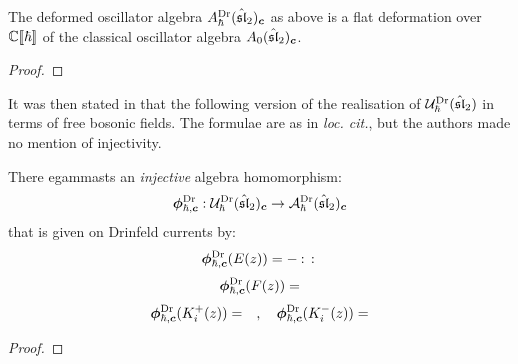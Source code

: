         \begin{proposition} \label{prop: q_deformed_affine_sl_2_oscillator_algebra_drinfeld_current_presentation_PBW}
            The deformed oscillator algebra $A_{\hbar}^{\mathrm{Dr}}(\hat{\mathfrak{sl}}_2)_{\boldsymbol{c}}$ as above is a flat deformation over $\mathbb{C}[\![\hbar]\!]$ of the classical oscillator algebra $A_0(\hat{\mathfrak{sl}}_2)_{\boldsymbol{c}}$.
        \end{proposition}
            \begin{proof}
                
            \end{proof}
            
        It was then stated in \cite[Proposition 4]{frenkel_reshetikhin_affine_QUEs_and_deformed_virasoro_and_finite_W_algebras} that the following version of the realisation of $\mathcal{U}_{\hbar}^{\mathrm{Dr}}(\hat{\mathfrak{sl}}_2)$ in terms of free bosonic fields. The formulae are as in \textit{loc. cit.}, but the authors made no mention of injectivity. 
        \begin{proposition} \label{prop: free_boson_realisation_quantum_affine_sl_2_drinfeld_current_presentation}
            There egammasts an \textit{injective} algebra homomorphism:
                \begin{equation} \label{equation: free_boson_realisation_quantum_affine_sl_2_drinfeld_current_presentation}
                    \boldsymbol{\phi}^{\mathrm{Dr}}_{\hbar, \boldsymbol{c}}: \mathcal{U}_{\hbar}^{\mathrm{Dr}}(\hat{\mathfrak{sl}}_2)_{\boldsymbol{c}} \to \mathcal{A}_{\hbar}^{\mathrm{Dr}}(\hat{\mathfrak{sl}}_2)_{\boldsymbol{c}}
                \end{equation}
            that is given on Drinfeld currents by:
                \begin{equation}
                    \boldsymbol{\phi}^{\mathrm{Dr}}_{\hbar, \boldsymbol{c}}( E(z) ) = -\: \mathbf{:} \: {  }  \: \mathbf{:} \:
                \end{equation}
                \begin{equation}
                    \boldsymbol{\phi}^{\mathrm{Dr}}_{\hbar, \boldsymbol{c}}( F(z) ) =
                \end{equation}
                \begin{equation}
                    \boldsymbol{\phi}^{\mathrm{Dr}}_{\hbar, \boldsymbol{c}}( K_i^+(z) ) = \quad, \quad \boldsymbol{\phi}^{\mathrm{Dr}}_{\hbar, \boldsymbol{c}}( K_i^-(z) ) =
                \end{equation}
        \end{proposition}
            \begin{proof}
                
            \end{proof}

